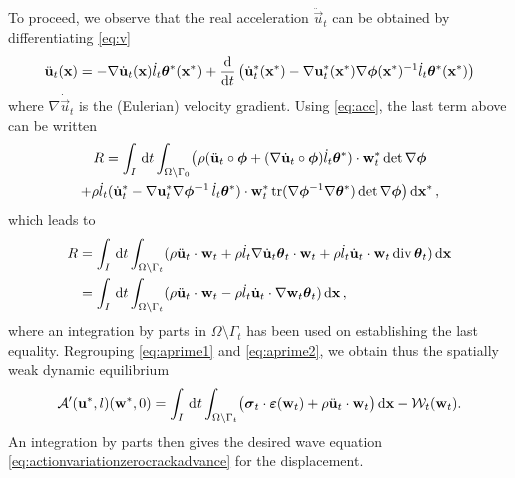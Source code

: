 To proceed, we observe that the real acceleration $\ddot{\vec{u}}_t$ can be obtained by differentiating \eqref{eq:v}
\begin{equation} \label{eq:acc}
\ddot{\vec{u}}_t(\vec{x})=-\nabla\dot{\vec{u}}_t(\vec{x})\dot{l}_t\vtheta^*(\vec{x}^*)+\frac{\md}{\md t}\left(\dot{\vec{u}}_t^*(\vec{x}^*)-\nabla\vec{u}_t^*(\vec{x}^*)\nabla\philt(\vec{x}^*)^{-1}\dot{l}_t\vtheta^*(\vec{x}^*)\right)
\end{equation}
where $\nabla\dot{\vec{u}}_t$ is the (Eulerian) velocity gradient. Using \eqref{eq:acc}, the last term above can be written
\begin{multline*}
R=\int_I\D{t}\int_\domaini\bigl(\rho(\ddot{\vec{u}}_t\circ\philt+(\nabla\dot{\vec{u}}_t\circ\philt)\dot{l}_t\vtheta^*)\cdot\vec{w}_t^*\det\nabla\philt \\
+\rho\dot{l}_t(\dot{\vec{u}}_t^*-\nabla\vec{u}_t^*\nabla\philt^{-1}\,\dot{l}_t\vtheta^*)\cdot\vec{w}_t^*\tr(\nabla\philt^{-1}\nabla\vtheta^*)\det\nabla\philt\bigr)\dxx\,,
\end{multline*}
which leads to
\begin{equation} \label{eq:aprime2}
\begin{aligned}
R &= \int_I\D{t}\int_\domaint(\rho\ddot{\vec{u}}_t\cdot\vec{w}_t+\rho\dot{l}_t\nabla\dot{\vec{u}}_t\vtheta_t\cdot\vec{w}_t+\rho\dot{l}_t\dot{\vec{u}}_t\cdot\vec{w}_t\div\vtheta_t)\dx \\
&= \int_I\D{t}\int_\domaint(\rho\ddot{\vec{u}}_t\cdot\vec{w}_t-\rho\dot{l}_t\dot{\vec{u}}_t\cdot\nabla\vec{w}_t\vtheta_t)\dx\,,
\end{aligned}
\end{equation}
where an integration by parts in $\Omega\setminus\Gamma_t$ has been used on establishing the last equality. Regrouping \eqref{eq:aprime1} and \eqref{eq:aprime2}, we obtain thus the spatially weak dynamic equilibrium
\begin{equation} \label{eq:spatiallyweakdyneq}
\mathcal{A}'(\vec{u}^*,l)(\vec{w}^*,0)=\int_I\D{t}\int_\domaint\bigl(\sig_t\cdot\eps(\vec{w}_t)+\rho\ddot{\vec{u}}_t\cdot\vec{w}_t\bigr)\dx-\mathcal{W}_t(\vec{w}_t).
\end{equation}
An integration by parts then gives the desired wave equation \eqref{eq:actionvariationzerocrackadvance} for the displacement.

